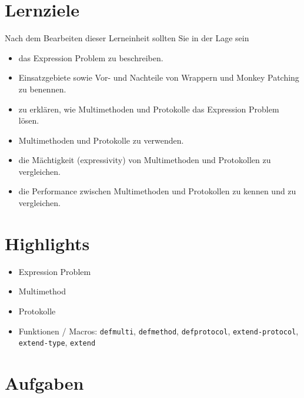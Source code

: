 \documentclass[11pt,a4paper]{article}
\theoremstyle{break}
\begin{document}
\section{Lernziele}

Nach dem Bearbeiten dieser Lerneinheit sollten Sie in der Lage sein

\begin{itemize}
    \item das Expression Problem zu beschreiben.
    \item Einsatzgebiete sowie Vor- und Nachteile von Wrappern und Monkey Patching zu benennen.
    \item zu erkl\"aren, wie Multimethoden und Protokolle das Expression Problem l\"osen.
    \item Multimethoden und Protokolle zu verwenden.
    \item die M\"achtigkeit (expressivity) von Multimethoden und Protokollen zu vergleichen.
    \item die Performance zwischen Multimethoden und Protokollen zu kennen und zu vergleichen.
\end{itemize}

\section{Highlights}

\begin{itemize}
    \item Expression Problem
    \item Multimethod
    \item Protokolle
    \item Funktionen / Macros: \verb|defmulti|, \verb|defmethod|, \verb|defprotocol|, \verb|extend-protocol|, \verb|extend-type|, \verb|extend|
\end{itemize}



\section{Aufgaben}
\end{document}
